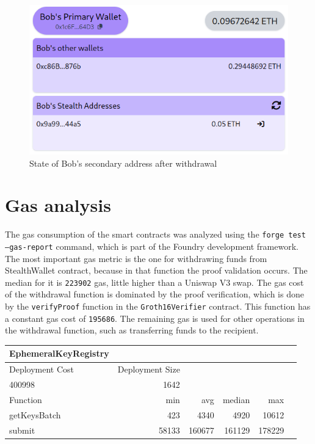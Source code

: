 \begin{figure}[h!]
    \centering
    \includegraphics[width=\textwidth]{assets/images/demo/after-withdrawal.png}
    \caption{State of Bob's secondary address after withdrawal}
    \label{fig:after-withdrawal}
\end{figure}

\section{Gas analysis}

The gas consumption of the smart contracts was analyzed using the \texttt{forge test --gas-report}
command, which is part of the Foundry development framework. The most important
gas metric is the one for withdrawing funds from StealthWallet contract,
because in that function the proof validation occurs. The median for it
is \texttt{223902} gas, little higher than a Uniswap V3 swap.
The gas cost of the withdrawal function is dominated by the proof verification, which is done by
the \texttt{verifyProof} function in the \texttt{Groth16Verifier} contract. This function has a
constant gas cost of \texttt{195686}. The remaining gas is used for other operations
in the withdrawal function, such as transferring funds to the recipient.

\begin{table}[H]
    \centering
    \begin{tabular}{|l|r|r|r|r|r|}
        \hline
        \textbf{EphemeralKeyRegistry} &  &  &  &\\
        \hline
        Deployment Cost & Deployment Size &  &  &\\
        400998 & 1642 &  &  &\\
        \hline
        Function & min & avg & median & max\\
        \hline
        getKeysBatch & 423 & 4340 & 4920 & 10612\\
        submit & 58133 & 160677 & 161129 & 178229\\
        \hline
    \end{tabular}
\end{table}

